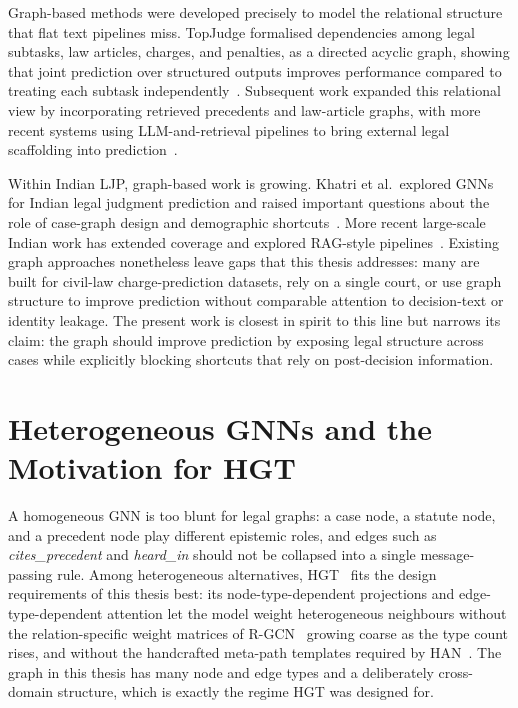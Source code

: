 Graph-based methods were developed precisely to model the relational structure that flat text pipelines miss. TopJudge formalised dependencies among legal subtasks, law articles, charges, and penalties, as a directed acyclic graph, showing that joint prediction over structured outputs improves performance compared to treating each subtask independently~\cite{zhong2018topjudge}. Subsequent work expanded this relational view by incorporating retrieved precedents and law-article graphs, with more recent systems using LLM-and-retrieval pipelines to bring external legal scaffolding into prediction~\cite{wu2023pljp, santosh2024precedents}.

Within Indian LJP, graph-based work is growing. Khatri et al.\ explored GNNs for Indian legal judgment prediction and raised important questions about the role of case-graph design and demographic shortcuts~\cite{khatri2023indianGNN}. More recent large-scale Indian work has extended coverage and explored RAG-style pipelines~\cite{nigam2025nyayaanumana}. Existing graph approaches nonetheless leave gaps that this thesis addresses: many are built for civil-law charge-prediction datasets, rely on a single court, or use graph structure to improve prediction without comparable attention to decision-text or identity leakage. The present work is closest in spirit to this line but narrows its claim: the graph should improve prediction by exposing legal structure across cases while explicitly blocking shortcuts that rely on post-decision information.

\section{Heterogeneous GNNs and the Motivation for HGT}

A homogeneous GNN is too blunt for legal graphs: a case node, a statute node, and a precedent node play different epistemic roles, and edges such as \emph{cites\_precedent} and \emph{heard\_in} should not be collapsed into a single message-passing rule. Among heterogeneous alternatives, HGT~\cite{hu2020hgt} fits the design requirements of this thesis best: its node-type-dependent projections and edge-type-dependent attention let the model weight heterogeneous neighbours without the relation-specific weight matrices of R-GCN~\cite{schlichtkrull2018rgcn} growing coarse as the type count rises, and without the handcrafted meta-path templates required by HAN~\cite{wang2019han}. The graph in this thesis has many node and edge types and a deliberately cross-domain structure, which is exactly the regime HGT was designed for.

